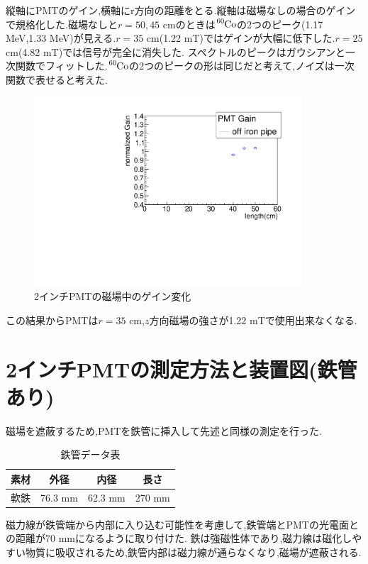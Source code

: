 縦軸にPMTのゲイン,横軸にr方向の距離をとる.縦軸は磁場なしの場合のゲインで規格化した.磁場なしと$r=50,45$ cmのときは$\ce{^{60}Co}$の2つのピーク(1.17 MeV,1.33 MeV)が見える.$r=35$ cm(1.22 mT)ではゲインが大幅に低下した.$r=25$ cm(4.82 mT)では信号が完全に消失した.
スペクトルのピークはガウシアンと一次関数でフィットした.$\ce{^{60}Co}$の2つのピークの形は同じだと考えて,ノイズは一次関数で表せると考えた.

\begin{figure}[t]
	\centering
		\includegraphics[angle=-90,width=10cm]{fig/iguchi/plot2inchPMT.pdf}
	\caption{2インチPMTの磁場中のゲイン変化}
	\label{plot2inchoff}
\end{figure}

この結果からPMTは$r=35$ cm,$z$方向磁場の強さが1.22 mTで使用出来なくなる.

\section{2インチPMTの測定方法と装置図(鉄管あり)}
磁場を遮蔽するため,PMTを鉄管に挿入して先述と同様の測定を行った.
\begin{table}[h]
	\centering
	 \begin{tabular}{cccc} \hline
		素材 & 外径 & 内径 & 長さ \\ \hline \hline
		軟鉄 & 76.3 mm & 62.3 mm & 270 mm \\ \hline
	\end{tabular}
	  \caption{鉄管データ表}
	  \label{ironpipedata}
\end{table}

磁力線が鉄管端から内部に入り込む可能性を考慮して,鉄管端とPMTの光電面との距離が70 mmになるように取り付けた.
鉄は強磁性体であり,磁力線は磁化しやすい物質に吸収されるため,鉄管内部は磁力線が通らなくなり,磁場が遮蔽される.

